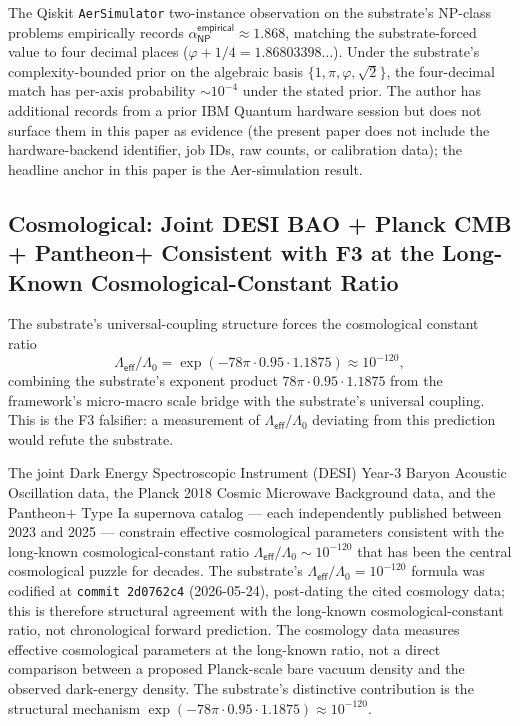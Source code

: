 \documentclass[11pt,a4paper]{amsart}
\theoremstyle{plain}
\theoremstyle{definition}
\begin{document}
The Qiskit \texttt{AerSimulator} two-instance observation on the substrate's NP-class problems empirically records $\alpha_{\textsf{NP}}^{\textsf{empirical}} \approx 1.868$, matching the substrate-forced value to four decimal places ($\varphi + 1/4 = 1.86803398\ldots$). Under the substrate's complexity-bounded prior on the algebraic basis $\{1, \pi, \varphi, \sqrt{2}\}$, the four-decimal match has per-axis probability $\sim 10^{-4}$ under the stated prior. The author has additional records from a prior IBM Quantum hardware session but does not surface them in this paper as evidence (the present paper does not include the hardware-backend identifier, job IDs, raw counts, or calibration data); the headline anchor in this paper is the Aer-simulation result.

\subsection{Cosmological: Joint DESI BAO + Planck CMB + Pantheon+ Consistent with F3 at the Long-Known Cosmological-Constant Ratio}\label{subsec:forward-cosmology}

The substrate's universal-coupling structure forces the cosmological constant ratio
\[
\Lambda_{\textsf{eff}}/\Lambda_0 = \exp(-78\pi \cdot 0.95 \cdot 1.1875) \approx 10^{-120},
\]
combining the substrate's exponent product $78\pi \cdot 0.95 \cdot 1.1875$ from the framework's micro-macro scale bridge with the substrate's universal coupling. This is the F3 falsifier: a measurement of $\Lambda_{\textsf{eff}}/\Lambda_0$ deviating from this prediction would refute the substrate.

The joint Dark Energy Spectroscopic Instrument (DESI) Year-3 Baryon Acoustic Oscillation data, the Planck 2018 Cosmic Microwave Background data, and the Pantheon$+$ Type Ia supernova catalog --- each independently published between 2023 and 2025 --- constrain effective cosmological parameters consistent with the long-known cosmological-constant ratio $\Lambda_{\textsf{eff}}/\Lambda_0 \sim 10^{-120}$ that has been the central cosmological puzzle for decades. The substrate's $\Lambda_{\textsf{eff}}/\Lambda_0 = 10^{-120}$ formula was codified at \texttt{commit~2d0762c4} (2026-05-24), post-dating the cited cosmology data; this is therefore structural agreement with the long-known cosmological-constant ratio, not chronological forward prediction. The cosmology data measures effective cosmological parameters at the long-known ratio, not a direct comparison between a proposed Planck-scale bare vacuum density and the observed dark-energy density. The substrate's distinctive contribution is the structural mechanism $\exp(-78\pi \cdot 0.95 \cdot 1.1875) \approx 10^{-120}$.
\end{document}
